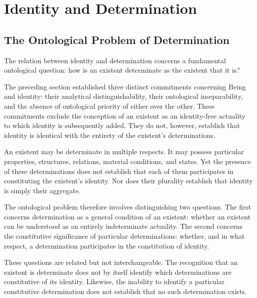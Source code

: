 
\section{Identity and Determination}
\label{sec:identity-and-determination}

\subsection{The Ontological Problem of Determination}

The relation between identity and determination concerns a
fundamental ontological question: how is an existent determinate
as the existent that it is?

The preceding section established three distinct commitments
concerning Being and identity: their analytical distinguishability,
their ontological inseparability, and the absence of ontological
priority of either over the other. These commitments exclude
the conception of an existent as an identity-free actuality
to which identity is subsequently added. They do not, however,
establish that identity is identical with the entirety of the
existent's determinations.

An existent may be determinate in multiple respects. It may
possess particular properties, structures, relations, material
conditions, and states. Yet the presence of these determinations
does not establish that each of them participates in constituting
the existent's identity. Nor does their plurality establish that
identity is simply their aggregate.

The ontological problem therefore involves distinguishing two
questions. The first concerns determination as a general condition
of an existent: whether an existent can be understood as an
entirely indeterminate actuality. The second concerns the
constitutive significance of particular determinations: whether,
and in what respect, a determination participates in the
constitution of identity.

These questions are related but not interchangeable. The
recognition that an existent is determinate does not by itself
identify which determinations are constitutive of its identity.
Likewise, the inability to identify a particular constitutive
determination does not establish that no such determination
exists.

